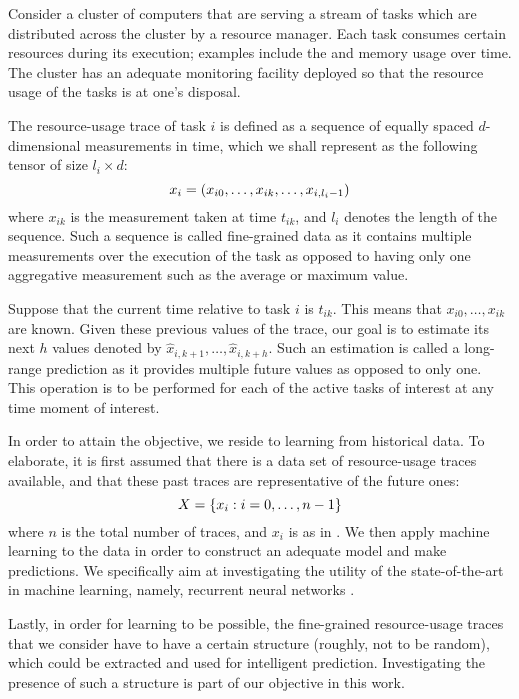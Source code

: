 Consider a cluster of computers that are serving a stream of tasks which are
distributed across the cluster by a resource manager. Each task consumes certain
resources during its execution; examples include the  and memory usage
over time. The cluster has an adequate monitoring facility deployed so that the
resource usage of the tasks is at one's disposal.

The resource-usage trace of task $i$ is defined as a sequence of equally spaced
$d$-dimensional measurements in time, which we shall represent as the following
tensor of size $l_i \times d$:
\begin{equation} \elab{trace}
  x_i = \left(x_{i0}, \dots, x_{ik}, \dots, x_{i,l_i - 1}\right)
\end{equation}
where $x_{ik}$ is the measurement taken at time $t_{ik}$, and $l_i$ denotes the
length of the sequence. Such a sequence is called fine-grained data as it
contains multiple measurements over the execution of the task as opposed to
having only one aggregative measurement such as the average or maximum value.

Suppose that the current time relative to task $i$ is $t_{ik}$. This means that
$x_{i0}, \dots, x_{ik}$ are known. Given these previous values of the trace, our
goal is to estimate its next $h$ values denoted by $\hat{x}_{i,k + 1}, \dots,
\hat{x}_{i,k + h}$. Such an estimation is called a long-range prediction as it
provides multiple future values as opposed to only one. This operation is to be
performed for each of the active tasks of interest at any time moment of
interest.

In order to attain the objective, we reside to learning from historical data. To
elaborate, it is first assumed that there is a data set of resource-usage traces
available, and that these past traces are representative of the future ones:
\begin{equation} \elab{traces}
  X = \{ x_i: i = 0, \dots, n - 1 \}
\end{equation}
where $n$ is the total number of traces, and $x_i$ is as in . We
then apply machine learning \cite{hastie2009} to the data in order to construct
an adequate model and make predictions. We specifically aim at investigating the
utility of the state-of-the-art in machine learning, namely, recurrent neural
networks \cite{goodfellow2016}.

Lastly, in order for learning to be possible, the fine-grained resource-usage
traces that we consider have to have a certain structure (roughly, not to be
random), which could be extracted and used for intelligent prediction.
Investigating the presence of such a structure is part of our objective in this
work.
